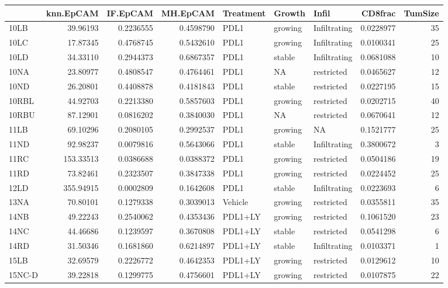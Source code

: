\documentclass[
]{book}
\begin{document}
\begin{tabular}{l|r|r|r|l|l|l|r|r}
\hline
  & knn.EpCAM & IF.EpCAM & MH.EpCAM & Treatment & Growth & Infil & CD8frac & TumSize\\
\hline
10LB & 39.96193 & 0.2236555 & 0.4598790 & PDL1 & growing & Infiltrating & 0.0228977 & 35\\
\hline
10LC & 17.87345 & 0.4768745 & 0.5432610 & PDL1 & growing & Infiltrating & 0.0100341 & 25\\
\hline
10LD & 34.33110 & 0.2944373 & 0.6867357 & PDL1 & stable & Infiltrating & 0.0681088 & 10\\
\hline
10NA & 23.80977 & 0.4808547 & 0.4764461 & PDL1 & NA & restricted & 0.0465627 & 12\\
\hline
10ND & 26.20801 & 0.4408878 & 0.4181843 & PDL1 & stable & restricted & 0.0227195 & 15\\
\hline
10RBL & 44.92703 & 0.2213380 & 0.5857603 & PDL1 & growing & restricted & 0.0202715 & 40\\
\hline
10RBU & 87.12901 & 0.0816202 & 0.3840030 & PDL1 & NA & restricted & 0.0670641 & 12\\
\hline
11LB & 69.10296 & 0.2080105 & 0.2992537 & PDL1 & growing & NA & 0.1521777 & 25\\
\hline
11ND & 92.98237 & 0.0079816 & 0.5643066 & PDL1 & stable & Infiltrating & 0.3800672 & 3\\
\hline
11RC & 153.33513 & 0.0386688 & 0.0388372 & PDL1 & growing & restricted & 0.0504186 & 19\\
\hline
11RD & 73.82461 & 0.2323507 & 0.3847338 & PDL1 & growing & restricted & 0.0224452 & 25\\
\hline
12LD & 355.94915 & 0.0002809 & 0.1642608 & PDL1 & stable & Infiltrating & 0.0223693 & 6\\
\hline
13NA & 70.80101 & 0.1279338 & 0.3039013 & Vehicle & growing & restricted & 0.0355811 & 35\\
\hline
14NB & 49.22243 & 0.2540062 & 0.4353436 & PDL1+LY & growing & restricted & 0.1061520 & 23\\
\hline
14NC & 44.46686 & 0.1239597 & 0.3670808 & PDL1+LY & stable & restricted & 0.0541298 & 6\\
\hline
14RD & 31.50346 & 0.1681860 & 0.6214897 & PDL1+LY & stable & Infiltrating & 0.0103371 & 1\\
\hline
15LB & 32.69579 & 0.2226772 & 0.4642353 & PDL1+LY & growing & restricted & 0.0129612 & 10\\
\hline
15NC-D & 39.22818 & 0.1299775 & 0.4756601 & PDL1+LY & growing & restricted & 0.0107875 & 22\\

\end{tabular}
\end{document}
